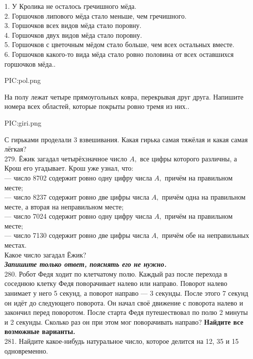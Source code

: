 1. У Кролика не осталось гречишного мёда.\\
2. Горшочков липового мёда стало меньше, чем гречишного.\\
3. Горшочков всех видов мёда стало поровну.\\
4. Горшочков двух видов мёда стало поровну.\\
5. Горшочков с цветочным мёдом стало больше, чем всех остальных вместе.\\
6. Горшочков какого-то вида мёда стало ровно половина от всех оставшихся горшочков мёда.\newpage{}. \begin{center}
{{PIC:pol.png}}
\end{center}
На полу лежат четыре прямоугольных ковра, перекрывая друг друга. Напишите номера всех областей, которые покрыты ровно тремя из них.\newpage{}. \begin{center}
{{PIC:giri.png}}
\end{center}
С гирьками проделали 3 взвешивания. Какая гирька самая тяжёлая и какая самая лёгкая?\\
279. Ёжик загадал четырёхзначное число $A,$ все цифры которого различны, а Крош его угадывает. Крош уже узнал, что:\\
 --- число 8702 содержит ровно одну цифру числа $A,$ причём на правильном месте;\\
 --- число 8237 содержит ровно две цифры числа $A,$ причём одна на правильном месте, а вторая на неправильном месте;\\
 --- число 7024 содержит ровно одну цифру числа $A,$ причём на правильном месте;\\
 --- число 7130 содержит ровно две цифры числа $A,$ причём обе на неправильных местах.\\
 Какое число загадал Ёжик?\\
  {\it {\textbf {Запишите только ответ, пояснять его не нужно.}}}\\
280. Робот Федя ходит по клетчатому полю. Каждый раз после перехода в соседнюю клетку Федя поворачивает налево или направо. Поворот налево занимает у него 5 секунд, а поворот направо --- 3 секунды. После этого 7 секунд он идёт до следующего поворота. Он начал своё движение с поворота налево и закончил перед поворотом. После старта Федя путешествовал по полю 2 минуты и 2 секунды. Сколько раз он при этом мог поворачивать направо? {\textbf {Найдите все возможные варианты.}}\\
281. Найдите какое-нибудь натуральное число, которое делится на 12, 35 и 15 одновременно.\\
